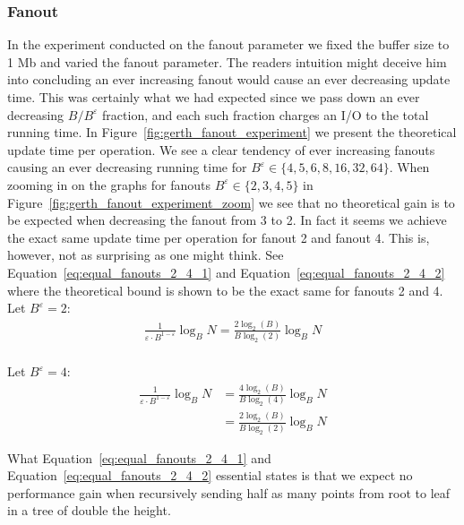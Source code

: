 \documentclass[twoside,11pt,openright]{report}
\def \epsilon {\varepsilon}
\begin{document}
\clearpage

\subsubsection*{Fanout}
In the experiment conducted on the fanout parameter we fixed the buffer size to 1 Mb and varied the fanout parameter. The readers intuition might deceive him into concluding an ever increasing fanout would cause an ever decreasing update time. This was certainly what we had expected since we pass down an ever decreasing $B / B^\epsilon$ fraction, and each such fraction charges an I/O to the total running time. In Figure~\ref{fig:gerth_fanout_experiment} we present the theoretical update time per operation. We see a clear tendency of ever increasing fanouts causing an ever decreasing running time for $B^\epsilon \in \{4, 5, 6, 8, 16, 32, 64 \}$. When zooming in on the graphs for fanouts $B^\epsilon \in \{2, 3, 4, 5\}$ in Figure~\ref{fig:gerth_fanout_experiment_zoom} we see that no theoretical gain is to be expected when decreasing the fanout from 3 to 2. In fact it seems we achieve the exact same update time per operation for fanout 2 and fanout 4. This is, however, not as surprising as one might think. See Equation~\ref{eq:equal_fanouts_2_4_1} and Equation~\ref{eq:equal_fanouts_2_4_2} where the theoretical bound is shown to be the exact same for fanouts 2 and 4. \\

Let $B^\epsilon = 2$:
\begin{equation} \label{eq:equal_fanouts_2_4_1}
	\begin{split}
		\frac{1}{\epsilon \cdot B^{1-\epsilon}}\log_B N = \frac{2\log_2(B)}{B\log_2(2)}\log_B N \\
	\end{split}
\end{equation}

Let $B^\epsilon = 4$:
\begin{equation} \label{eq:equal_fanouts_2_4_2}
	\begin{split}
		\frac{1}{\epsilon \cdot B^{1-\epsilon}}\log_B N & = \frac{4\log_2(B)}{B\log_2(4)}\log_B N \\
		& = \frac{2\log_2(B)}{B\log_2(2)}\log_B N
	\end{split}
\end{equation}

What Equation~\ref{eq:equal_fanouts_2_4_1} and Equation~\ref{eq:equal_fanouts_2_4_2} essential states is that we expect no performance gain when recursively sending half as many points from root to leaf in a tree of double the height.
\end{document}
